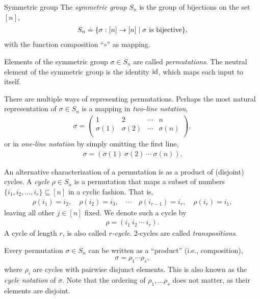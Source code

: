 \begin{ex}{Symmetric group}{}
The \emph{symmetric group} $S_n$ is the group of bijections on the set $[n]$, \begin{align}
    S_n \overset{.}{=} \{\sigma : [n] \to [n] \mid \text{$\sigma$ is bijective}\},
\end{align} with the function composition ``$\circ$'' as mapping.

Elements of the symmetric group ${\sigma \in S_n}$ are called \emph{permutations}. The neutral element of the symmetric group is the identity $\mathrm{id}$, which maps each input to itself.

There are multiple ways of representing permutations. Perhaps the most natural representation of ${\sigma \in S_n}$ is a mapping in \emph{two-line notation}, \begin{align}
    \sigma = \begin{pmatrix}
        1 & 2 & \cdots & n \\
        \sigma(1) & \sigma(2) & \cdots & \sigma(n) \\
    \end{pmatrix},
\end{align} or in \emph{one-line notation} by simply omitting the first line, \begin{align}
    \sigma = (\sigma(1)\ \sigma(2)\ \cdots\ \sigma(n)).
\end{align}

An alternative characterization of a permutation is as a product of (disjoint) cycles. A \emph{cycle} ${\rho \in S_n}$ is a permutation that maps a subset of numbers ${\{i_1, i_2, \dots, i_r\} \subseteq [n]}$ in a cyclic fashion. That is, \begin{align}
    \rho(i_1) = i_2,\quad \rho(i_2) = i_3,\quad \cdots\quad \rho(i_{r-1}) = i_r,\quad \rho(i_r) = i_1,
\end{align} leaving all other ${j \in [n]}$ fixed. We denote such a cycle by \begin{align}
    \rho = (i_1\ i_2\ \cdots\ i_r).
\end{align} A cycle of length $r$, is also called \emph{$r$-cycle}. 2-cycles are called \emph{transpositions}.

Every permutation ${\sigma \in S_n}$ can be written as a ``product'' (i.e., composition), \begin{align}
    \sigma = \rho_1 \cdots \rho_s,
\end{align} where $\rho_i$ are cycles with pairwise disjunct elements. This is also known as the \emph{cycle notation} of $\sigma$. Note that the ordering of $\rho_1, \dots \rho_s$ does not matter, as their elements are disjoint.


\end{ex}
